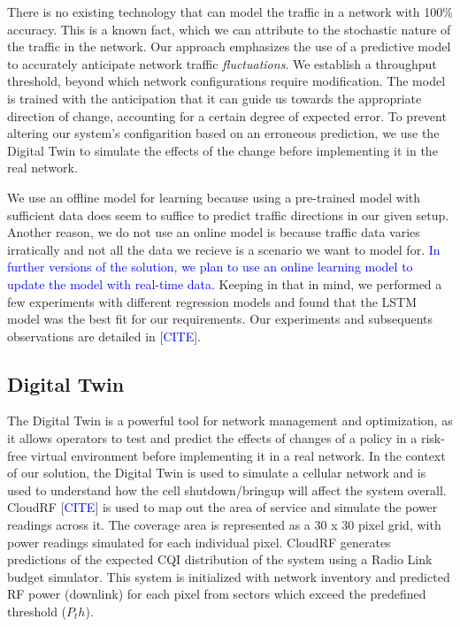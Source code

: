 There is no existing technology that can model the traffic in a network with 100\% accuracy. This is a known fact, which we can attribute to the stochastic nature of the traffic in the network.
Our approach emphasizes the use of a predictive model to accurately anticipate network traffic \textit{fluctuations}.
We establish a throughput threshold, beyond which network configurations require modification. 
The model is trained with the anticipation that it can guide us towards the appropriate direction of change, accounting for a certain degree of expected error.
To prevent altering our system's configarition based on an erroneous prediction, we use the Digital Twin to simulate the effects of the change before implementing it in the real network.  

We use an offline model for learning because using a pre-trained model with sufficient data does seem to suffice to predict traffic directions in our given setup.
Another reason, we do not use an online model is because traffic data varies irratically and not all the data we recieve is a scenario we want to model for.
\textcolor{blue}{In further versions of the solution, we plan to use an online learning model to update the model with real-time data.}
Keeping in that in mind, we performed a few experiments with different regression models and found that the LSTM model was the best fit for our requirements.
Our experiments and subsequents observations are detailed in [\textcolor{blue}{CITE}].

\subsection{Digital Twin}

The Digital Twin is a powerful tool for network management and optimization, as it allows operators to test and predict the effects of changes of a policy in a risk-free virtual environment before implementing it in a real network.
In the context of our solution, the Digital Twin is used to simulate a cellular network and is used to understand how the cell shutdown/bringup will affect the system overall. 
CloudRF [\textcolor{blue}{CITE}] is used to map out the area of service and simulate the power readings across it. 
The coverage area is represented as a 30 x 30 pixel grid, with power readings simulated for each individual pixel.
CloudRF generates predictions of the expected CQI distribution of the system using a Radio Link budget simulator.
This system is initialized with network inventory and predicted RF power (downlink) for each pixel from sectors which exceed the predefined threshold ($P_th$).

